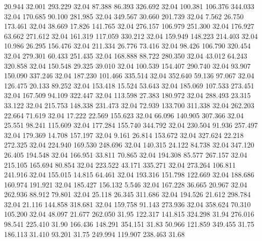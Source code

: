   20.944   32.001  293.229        32.04
  87.388   86.393  326.692        32.04
 100.381  106.376  344.033        32.04
 170.685   90.100  281.985        32.04
 349.567   30.660  201.739        32.04
   7.562   26.750  173.461        32.04
  38.669   17.826  141.765        32.04
 276.157  106.979  251.300        32.04
 176.927   63.662  271.612        32.04
 161.319  117.059  330.212        32.04
 159.949  148.223  214.403        32.04
  10.986   26.295  156.476        32.04
 211.334   26.776   73.416        32.04
  98.426  106.790  320.454        32.04
 279.301   60.433  251.435        32.04
 168.888   88.722  280.350        32.04
  43.012   64.243  320.858        32.04
 150.548   29.325   39.010        32.04
 100.539  154.407  290.740        32.04
  93.907  150.090  337.246        32.04
 187.230  101.466  335.514        32.04
 352.640   59.136   97.067        32.04
 126.475   20.133   89.252        32.04
 153.418   15.524   53.643        32.04
 185.069  107.533  273.451        32.04
 167.509   94.109  322.447        32.04
 113.598   27.383  180.972        32.04
 288.493   23.315   33.122        32.04
 215.753  148.338  231.473        32.04
  72.939  133.700  311.338        32.04
 262.203   22.664   71.619        32.04
  17.222   22.569  155.623        32.04
  66.096  140.905  307.366        32.04
  25.551   98.241  115.609        32.04
 177.284  155.740  344.792        32.04
 230.504   91.936  257.497        32.04
 179.369   14.708  157.197        32.04
   9.161   26.814  153.672        32.04
 327.624   22.218  272.325        32.04
 224.940  169.530  248.696        32.04
 140.315   24.122   84.738        32.04
 347.120   26.405  194.548        32.04
 166.951   33.811   70.865        32.04
 194.308   85.577  267.157        32.04
 215.105  165.694   80.854        32.04
 223.522   43.171  335.271        32.04
 273.264  106.811  241.916        32.04
 155.015   14.815   64.461        32.04
 193.316  151.798  122.669        32.04
 188.686  160.974  191.921        32.04
 185.427  156.132    5.546        32.04
 167.228   36.665   20.967        32.04
 262.936   88.912   79.801        32.04
  25.118   26.345  311.686        32.04
 194.526   21.612  298.784        32.04
  21.116  144.858  318.681        32.04
 159.758   91.143  273.936        32.04
 358.624   70.310  105.200        32.04
  48.097   21.677  262.050        31.95
 122.317  141.815  324.298        31.94
 276.016   98.541  225.410        31.90
 166.436  148.291  354.151        31.83
  50.966  121.859  349.455        31.75
 186.113   31.410   93.201        31.75
 249.994  119.907  238.463        31.68
